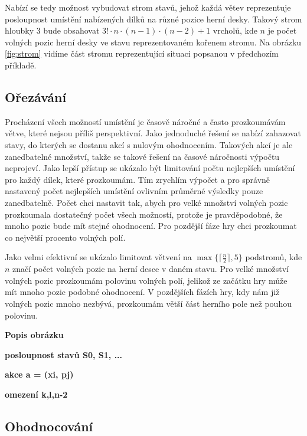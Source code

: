 \figureOmezeniHladovehoPristupuPriklad

Nabízí se tedy možnost vybudovat strom stavů, jehož každá větev reprezentuje posloupnost umístění nabízených dílků na různé pozice herní desky. Takový strom hloubky 3 bude obsahovat $3!\cdot n \cdot(n-1) \cdot(n-2) + 1$ vrcholů, kde $n$ je počet volných pozic herní desky ve stavu reprezentovaném kořenem stromu. Na obrázku \ref{fig:strom} vidíme část stromu reprezentující situaci popsanou v předchozím příkladě.

\figureStrom

\subsection{Ořezávání}

Procházení všech možností umístění je časově náročné a často prozkoumávám větve, které nejsou příliš perspektivní. Jako jednoduché řešení se nabízí zahazovat stavy, do kterých se dostanu akcí s nulovým ohodnocením. Takových akcí je ale zanedbatelné množství, takže se takové řešení na časové náročnosti výpočtu neprojeví. 
Jako lepší přístup se ukázalo být limitování počtu nejlepších umístění pro každý dílek, které prozkoumám. Tím zrychlím výpočet a pro správně nastavený počet nejlepších umístění ovlivním průměrné výsledky pouze zanedbatelně.
Počet chci nastavit tak, abych pro velké množství volných pozic prozkoumala dostatečný počet všech možností, protože je pravděpodobné, že mnoho pozic bude mít stejné ohodnocení. Pro pozdější fáze hry chci prozkoumat co největší procento volných polí.

Jako velmi efektivní se ukázalo limitovat větvení na $\max \{\lceil\frac{n}{2}\rceil ,5\}$ podstromů, kde $n$ značí počet volných pozic na herní desce v daném stavu. Pro velké množství volných pozic prozkoumám polovinu volných polí, jelikož ze začátku hry může mít mnoho pozic podobné ohodnocení. V pozdějších fázích hry, kdy nám již volných pozic mnoho nezbývá, prozkoumám větší část herního pole než pouhou polovinu.

\figureTS

\textbf{Popis obrázku}

\textbf{posloupnost stavů S0, S1, ...}

\textbf{akce a = (xi, pj)}

\textbf{omezení k,l,n-2}

\subsection{Ohodnocování}

